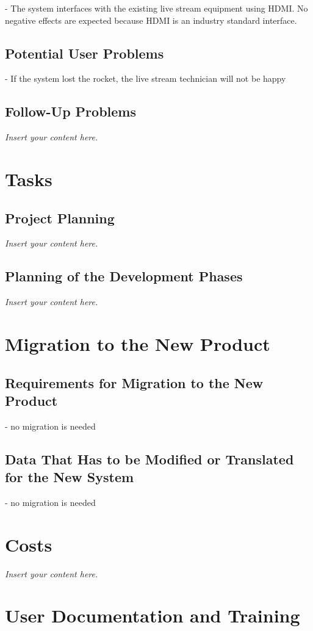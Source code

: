 \documentclass[12pt]{article}
\newcommand{\lips}{\textit{Insert your content here.}}
\begin{document}
- The system interfaces with the existing live stream equipment using HDMI. No negative effects are expected because HDMI is an industry standard interface.

\subsection{Potential User Problems}

- If the system lost the rocket, the live stream technician will not be happy

\subsection{Follow-Up Problems}
\lips

\section{Tasks}
\subsection{Project Planning}
\lips

\subsection{Planning of the Development Phases}
\lips

\section{Migration to the New Product}
\subsection{Requirements for Migration to the New Product}

- no migration is needed

\subsection{Data That Has to be Modified or Translated for the New System}

- no migration is needed

\section{Costs}
\lips
\section{User Documentation and Training}
\end{document}

